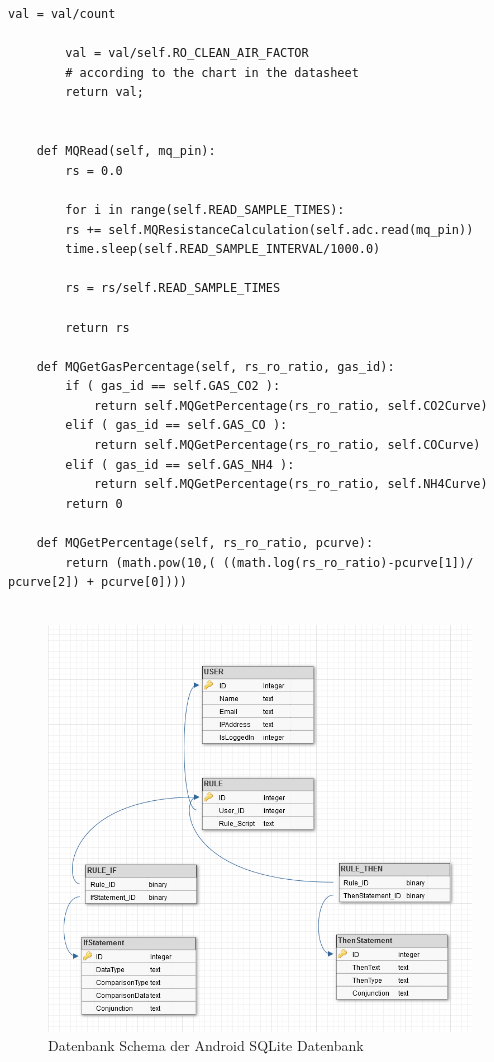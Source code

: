 \begin{lstlisting}[label=list:MQClass, caption={Auswertung der MQ-Sensorwerte}]
		val = val/count                                         
	
		val = val/self.RO_CLEAN_AIR_FACTOR                     
		# according to the chart in the datasheet 
		return val;
	
	
	def MQRead(self, mq_pin):
		rs = 0.0
		
		for i in range(self.READ_SAMPLE_TIMES):
		rs += self.MQResistanceCalculation(self.adc.read(mq_pin))
		time.sleep(self.READ_SAMPLE_INTERVAL/1000.0)
		
		rs = rs/self.READ_SAMPLE_TIMES
		
		return rs
	
	def MQGetGasPercentage(self, rs_ro_ratio, gas_id):
		if ( gas_id == self.GAS_CO2 ):
			return self.MQGetPercentage(rs_ro_ratio, self.CO2Curve)
		elif ( gas_id == self.GAS_CO ):
			return self.MQGetPercentage(rs_ro_ratio, self.COCurve)
		elif ( gas_id == self.GAS_NH4 ):
			return self.MQGetPercentage(rs_ro_ratio, self.NH4Curve)
		return 0

	def MQGetPercentage(self, rs_ro_ratio, pcurve):
		return (math.pow(10,( ((math.log(rs_ro_ratio)-pcurve[1])/ pcurve[2]) + pcurve[0])))
	

\end{lstlisting}
\begin{figure}
	\centering
	\includegraphics[width=1\textwidth]{images/DBSchema.png}
	\caption{Datenbank Schema der Android SQLite Datenbank}
	\label{fig:androiddbschema}
\end{figure}